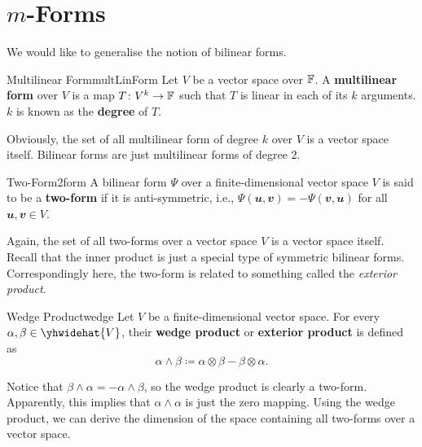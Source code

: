\documentclass[math, code]{amznotes}
\theoremstyle{remark}
\begin{document}
\section{$m$-Forms}
We would like to generalise the notion of bilinear forms.
\begin{dfnbox}{Multilinear Form}{multLinForm}
    Let $V$ be a vector space over $\mathbb{F}$. A {\color{red} \textbf{multilinear form}} over $V$ is a map $T \colon V^k \to \mathbb{F}$ such that $T$ is linear in each of its $k$ arguments. $k$ is known as the {\color{red} \textbf{degree}} of $T$.
\end{dfnbox}
Obviously, the set of all multilinear form of degree $k$ over $V$ is a vector space itself. Bilinear forms are just multilinear forms of degree $2$. 
\begin{dfnbox}{Two-Form}{2form}
    A bilinear form $\Psi$ over a finite-dimensional vector space $V$ is said to be a {\color{red} \textbf{two-form}} if it is anti-symmetric, i.e., $\Psi(\mathbfit{u}, \mathbfit{v}) = -\Psi(\mathbfit{v}, \mathbfit{u})$ for all $\mathbfit{u}, \mathbfit{v} \in V$.
\end{dfnbox}
Again, the set of all two-forms over a vector space $V$ is a vector space itself. Recall that the inner product is just a special type of symmetric bilinear forms. Correspondingly here, the two-form is related to something called the \textit{exterior product}.
\begin{dfnbox}{Wedge Product}{wedge}
    Let $V$ be a finite-dimensional vector space. For every $\alpha, \beta \in \yhwidehat{V}$, their {\color{red} \textbf{wedge product}} or {\color{red} \textbf{exterior product}} is defined as 
    \begin{equation*}
        \alpha \wedge \beta \coloneqq \alpha \otimes \beta - \beta \otimes \alpha.
    \end{equation*}
\end{dfnbox}
Notice that $\beta \wedge \alpha = -\alpha \wedge \beta$, so the wedge product is clearly a two-form. Apparently, this implies that $\alpha \wedge \alpha$ is just the zero mapping. Using the wedge product, we can derive the dimension of the space containing all two-forms over a vector space.
\end{document}
